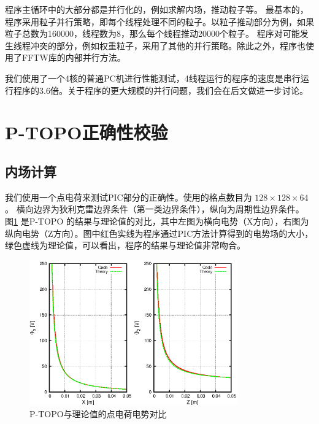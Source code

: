 程序主循环中的大部分都是并行化的，例如求解内场，推动粒子等。
最基本的，程序采用粒子并行策略，即每个线程处理不同的粒子。以粒子推动部分为例，如果粒子总数为160000，线程数为8，那么每个线程推动20000个粒子。
程序对可能发生线程冲突的部分，例如权重粒子，采用了其他的并行策略。除此之外，程序也使用了FFTW库的内部并行方法。



我们使用了一个4核的普通PC机进行性能测试，4线程运行的程序的速度是串行运行程序的3.6倍。关于程序的更大规模的并行问题，我们会在后文做进一步讨论。

\section{P-TOPO正确性校验}
\subsection{内场计算}
我们使用一个点电荷来测试PIC部分的正确性。使用的格点数目为 $128\times128\times64$。 横向边界为狄利克雷边界条件（第一类边界条件），纵向为周期性边界条件。 图\ref{fig:P_TOPO_verification1} 是P-TOPO 的结果与理论值的对比，其中左图为横向电势（X方向），右图为纵向电势（Z方向）。图中红色实线为程序通过PIC方法计算得到的电势场的大小，绿色虚线为理论值，可以看出，程序的结果与理论值非常吻合。

\begin{figure}[!htb]
    \centering
    \includegraphics[width=0.8\textwidth]{Img/P_TOPO_verification1.eps}
    \caption{P-TOPO与理论值的点电荷电势对比}
    \label{fig:P_TOPO_verification1}
\end{figure}

